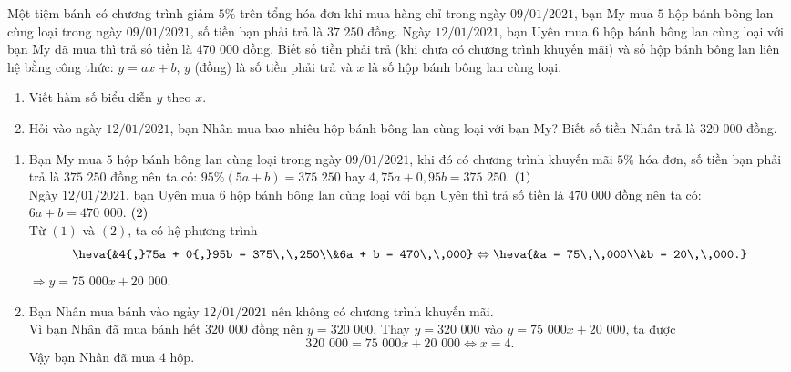 \begin{bt}%
	Một tiệm bánh có chương trình giảm $5\%$ trên tổng hóa đơn khi mua hàng chỉ trong ngày $09/01/2021$, bạn My mua $5$ hộp bánh bông lan cùng loại trong ngày $09/01/2021$, số tiền bạn phải trả là $37\,\, 250$ đồng. Ngày $12/01/2021$, bạn Uyên mua $6$ hộp bánh bông lan cùng loại với bạn My đã mua thì trả số tiền là $470\,\,000$ đồng. Biết số tiền phải trả (khi chưa có chương trình khuyến mãi) và số hộp bánh bông lan liên hệ bằng công thức: $y = ax + b$, $y$ (đồng) là số tiền phải trả và $x$ là số hộp bánh bông lan cùng loại.
	\begin{enumerate}
		\item Viết hàm số biểu diễn $y$ theo $x$.
		\item Hỏi vào ngày $12/01/2021$, bạn Nhân mua bao nhiêu hộp bánh bông lan cùng loại với bạn My? Biết số tiền Nhân trả là $320\,\,000$ đồng.
	\end{enumerate}
	\loigiai 
	{
		\begin{enumerate}
			\item Bạn My mua $5$ hộp bánh bông lan cùng loại trong ngày $09/01/2021$, khi đó có chương trình khuyến mãi $5\%$ hóa đơn, số tiền bạn phải trả là $375\,\,250$ đồng nên ta có: $95\%(5a + b) = 375\,\,250$ hay $4{,}75a + 0{,}95b = 375\,\,250$. $\hfill (1)$\\
			Ngày $12/01/2021$, bạn Uyên mua $6$ hộp bánh bông lan cùng loại với bạn Uyên thì trả số tiền là $470\,\,000$ đồng nên ta có: $6a + b = 470\,\,000$. $\hfill (2)$\\
			Từ $(1)$ và $(2)$, ta có hệ phương trình
			$$ \heva{&4{,}75a + 0{,}95b = 375\,\,250\\&6a + b = 470\,\,000} \Leftrightarrow \heva{&a = 75\,\,000\\&b = 20\,\,000.} $$
			$\Rightarrow y = 75\,\,000x + 20\,\,000$.
			\item Bạn Nhân mua bánh vào ngày $12/01/2021$ nên không có chương trình khuyến mãi.\\
			Vì bạn Nhân đã mua bánh hết $320\,\,000$ đồng nên $y = 320\,\,000$. Thay $y = 320\,\,000$ vào $y = 75\,\,000x + 20\,\,000$, ta được
			$$ 320\,\,000 = 75\,\,000x + 20\,\,000 \Leftrightarrow x = 4. $$
			Vậy bạn Nhân đã mua $4$ hộp.
		\end{enumerate}
	}	
\end{bt}

